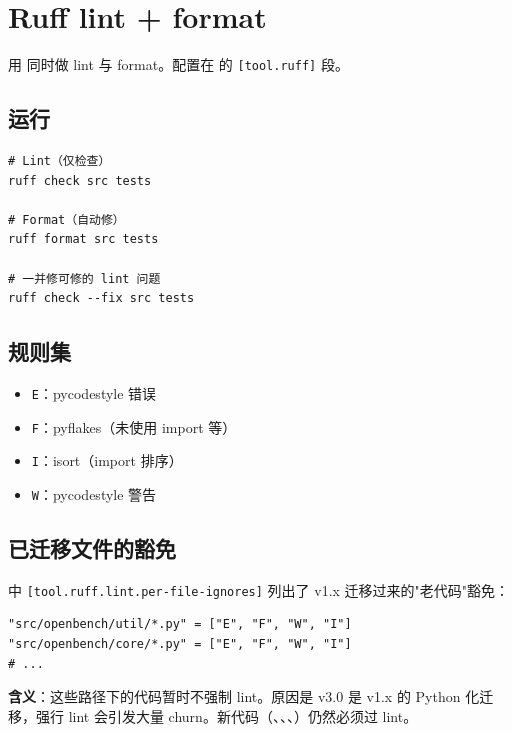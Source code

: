 \section{Ruff lint + format}

\openbench{} 用  同时做 lint 与 format。配置在  的 \texttt{[tool.ruff]} 段。

\subsection{运行}

\begin{verbatim}
# Lint（仅检查）
ruff check src tests

# Format（自动修）
ruff format src tests

# 一并修可修的 lint 问题
ruff check --fix src tests
\end{verbatim}

\subsection{规则集}

\begin{itemize}
  \item \texttt{E}：pycodestyle 错误
  \item \texttt{F}：pyflakes（未使用 import 等）
  \item \texttt{I}：isort（import 排序）
  \item \texttt{W}：pycodestyle 警告
\end{itemize}

\subsection{已迁移文件的豁免}

 中 \texttt{[tool.ruff.lint.per-file-ignores]} 列出了 v1.x 迁移过来的"老代码"豁免：

\begin{verbatim}
"src/openbench/util/*.py" = ["E", "F", "W", "I"]
"src/openbench/core/*.py" = ["E", "F", "W", "I"]
# ...
\end{verbatim}

\textbf{含义}：这些路径下的代码暂时不强制 lint。原因是 v3.0 是 v1.x 的 Python 化迁移，强行 lint 会引发大量 churn。新代码（、、、）仍然必须过 lint。


